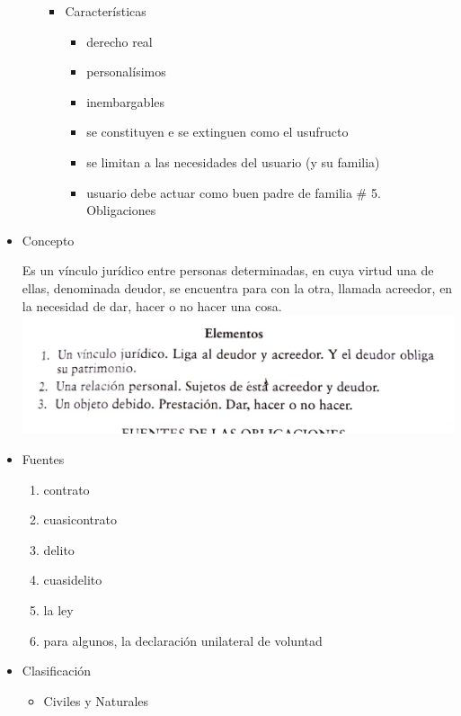 \documentclass[]{article}
\providecommand{\tightlist}{%
  \setlength{\itemsep}{0pt}\setlength{\parskip}{0pt}}
\begin{document}
\begin{itemize}
\begin{itemize}
    \begin{itemize}
    \tightlist
    \item
      Características

      \begin{itemize}
      \tightlist
      \item
        derecho real
      \item
        personalísimos
      \item
        inembargables
      \item
        se constituyen e se extinguen como el usufructo
      \item
        se limitan a las necesidades del usuario (y su familia)
      \item
        usuario debe actuar como buen padre de familia \# 5.
        Obligaciones
      \end{itemize}
    \end{itemize}
  \end{itemize}
\item
  Concepto

  Es un vínculo jurídico entre personas determinadas, en cuya virtud una
  de ellas, denominada deudor, se encuentra para con la otra, llamada
  acreedor, en la necesidad de dar, hacer o no hacer una cosa.
  \includegraphics{elementos.jpeg}
\item
  Fuentes

  \begin{enumerate}
  \def\labelenumi{\arabic{enumi}.}
  \tightlist
  \item
    contrato
  \item
    cuasicontrato
  \item
    delito
  \item
    cuasidelito
  \item
    la ley
  \item
    para algunos, la declaración unilateral de voluntad
  \end{enumerate}
\item
  Clasificación

  \begin{itemize}
  \item
    Civiles y Naturales


\end{itemize}
\end{itemize}
\end{document}
